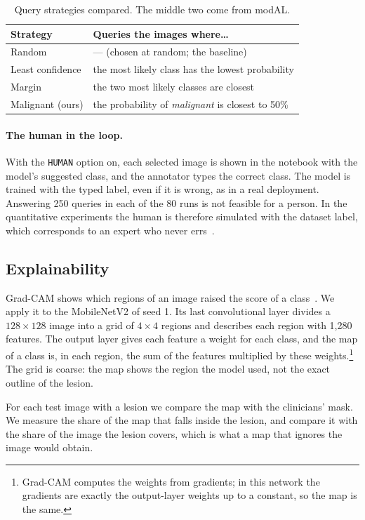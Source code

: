\documentclass{article}
\begin{document}
\begin{table}[t]
\centering
\small
\begin{tabular}{@{}p{}p{}@{}}
\toprule
Strategy & Queries the images where\ldots \\
\midrule
Random & --- (chosen at random; the baseline) \\
Least confidence & the most likely class has the lowest probability \\
Margin & the two most likely classes are closest \\
Malignant (ours) & the probability of \emph{malignant} is closest to 50\% \\
\bottomrule
\end{tabular}
\caption{Query strategies compared. The middle two come from modAL.}
\label{tab:strategies}
\end{table}

\paragraph{The human in the loop.} With the \texttt{HUMAN} option on, each selected image is
shown in the notebook with the model's suggested class, and the annotator types the correct
class. The model is trained with the typed label, even if it is wrong, as in a real
deployment. Answering 250 queries in each of the 80 runs is not feasible for a person.
In the quantitative experiments the human is therefore simulated with the dataset label,
which corresponds to an expert who never errs~\cite{budd2021survey}.

\subsection{Explainability}
Grad-CAM shows which regions of an image raised the score of a class~\cite{selvaraju2017gradcam}.
We apply it to the MobileNetV2 of seed 1. Its last convolutional layer divides a
$128\times128$ image into a grid of $4\times4$ regions and describes each region with 1{,}280
features. The output layer gives each feature a weight for each class, and the map of a
class is, in each region, the sum of the features multiplied by these weights.\footnote{Grad-CAM
computes the weights from gradients; in this network the gradients are exactly the
output-layer weights up to a constant, so the map is the same.} The grid is coarse: the map
shows the region the model used, not the exact outline of the lesion.

For each test image with a lesion we compare the map with the clinicians' mask. We measure
the share of the map that falls inside the lesion, and compare it with the share of the
image the lesion covers, which is what a map that ignores the image would obtain.
\end{document}
